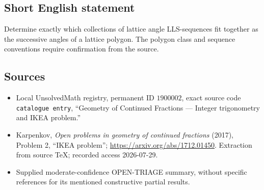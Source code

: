 \documentclass[11pt]{article}
\begin{document}
\subsection{Short English statement}
Determine exactly which collections of lattice angle LLS-sequences fit together as the successive angles of a lattice polygon. The polygon class and sequence conventions require confirmation from the source.
\subsection{Sources}
\begin{itemize}
\item Local UnsolvedMath registry, permanent ID \(1900002\), exact source code \texttt{catalogue entry}, ``Geometry of Continued Fractions --- Integer trigonometry and IKEA problem.''
\item Karpenkov, \emph{Open problems in geometry of continued fractions} (2017), Problem 2, ``IKEA problem''; \url{https://arxiv.org/abs/1712.01450}. Extraction from source TeX; recorded access 2026-07-29.
\item Supplied moderate-confidence OPEN-TRIAGE summary, without specific references for its mentioned constructive partial results.
\end{itemize}
\end{document}
